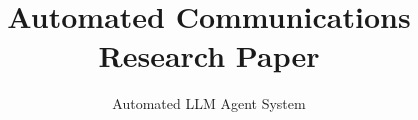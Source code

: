 \documentclass[journal]{IEEEtran}
\begin{document}
\title{Automated Communications Research Paper}

\author{Automated LLM Agent System}

\maketitle

\begin{abstract}

\end{abstract}



















\end{document}
